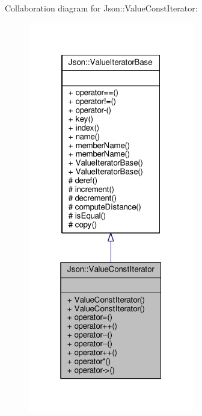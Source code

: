 Collaboration diagram for Json\+:\+:Value\+Const\+Iterator\+:
\nopagebreak
\begin{figure}[H]
\begin{center}
\leavevmode
\includegraphics[width=205pt]{d9/d3e/classJson_1_1ValueConstIterator__coll__graph}
\end{center}
\end{figure}
